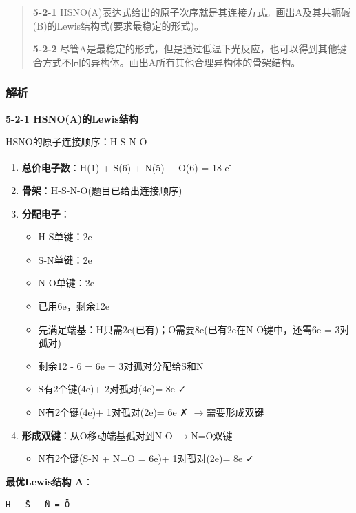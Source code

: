\documentclass[a4paper,11pt]{ctexart}
\providecommand{\tightlist}{\setlength{\itemsep}{0pt}\setlength{\parskip}{0pt}}
\newcommand{\箭}{\ensuremath{\rightarrow}}
\newcommand{\左箭}{\ensuremath{\leftarrow}}
\newcommand{\上箭}{\ensuremath{\uparrow}}
\newcommand{\下箭}{\ensuremath{\downarrow}}
\newcommand{\衡}{\ensuremath{\rightleftharpoons}}
\newcommand{\双箭}{\ensuremath{\leftrightarrow}}
\newcommand{\约等于}{\ensuremath{\approx}}
\newcommand{\小于等于}{\ensuremath{\leq}}
\newcommand{\大于等于}{\ensuremath{\geq}}
\newcommand{\不等于}{\ensuremath{\neq}}
\newcommand{\西格马}{\ensuremath{\sigma}}
\newcommand{\派}{\ensuremath{\pi}}
\begin{document}
\begin{quote}
\textbf{5-2-1} HSNO(A)表达式给出的原子次序就是其连接方式。画出A及其共轭碱(B)的Lewis结构式(要求最稳定的形式)。

\textbf{5-2-2} 尽管A是最稳定的形式，但是通过低温下光反应，也可以得到其他键合方式不同的异构体。画出A所有其他合理异构体的骨架结构。
\end{quote}

\subsubsection{解析}\label{ux89e3ux6790-2}

\textbf{5-2-1 HSNO(A)的Lewis结构}

HSNO的原子连接顺序：H-S-N-O

\begin{enumerate}
\def\labelenumi{\arabic{enumi}.}
\tightlist
\item
  \textbf{总价电子数}：H(1) + S(6) + N(5) + O(6) = 18 e\textsuperscript{-}
\item
  \textbf{骨架}：H-S-N-O(题目已给出连接顺序)
\item
  \textbf{分配电子}：

  \begin{itemize}
  \tightlist
  \item
    H-S单键：2e
  \item
    S-N单键：2e
  \item
    N-O单键：2e
  \item
    已用6e，剩余12e
  \item
    先满足端基：H只需2e(已有)；O需要8e(已有2e在N-O键中，还需6e = 3对孤对)
  \item
    剩余12 - 6 = 6e = 3对孤对分配给S和N
  \item
    S有2个键(4e)+ 2对孤对(4e)= 8e ✓
  \item
    N有2个键(4e)+ 1对孤对(2e)= 6e ✗ \箭 需要形成双键
  \end{itemize}
\item
  \textbf{形成双键}：从O移动端基孤对到N-O \箭 N=O双键

  \begin{itemize}
  \tightlist
  \item
    N有2个键(S-N + N=O = 6e)+ 1对孤对(2e)= 8e ✓
  \end{itemize}
\end{enumerate}

\textbf{最优Lewis结构 A}：

\begin{verbatim}
H — S̈ — N̈ = Ö
\end{verbatim}
\end{document}
